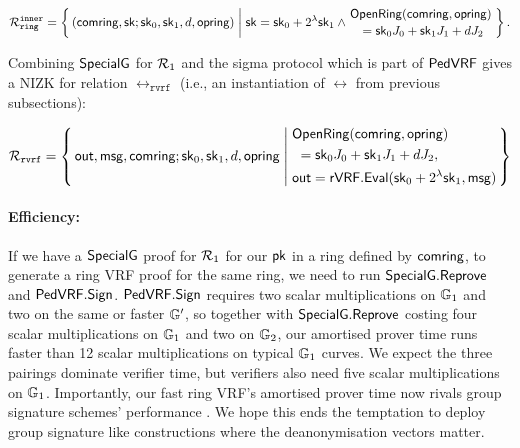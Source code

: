 $$  \Rring^{\inner} = \Setst{ (\comring, \sk ; \sk_0, \sk_1, d, \openring) }{
  \sk = \sk_0+ 2^{\lambda} \sk_1 \wedge
 \genfrac{}{}{0pt}{}{ \eprint{\rVRF.}{}\OpenRing(\comring,\openring) }{ \,\, = \sk_0 \genJ_0 + \sk_1 \genJ_1 + d \genJ_2 }
} \mathperiod $$

Combining ${\mathsf{SpecialG}}$ for $\mathcal{R}_1$ and the sigma protocol which is part of ${\mathsf{PedVRF}}$ gives a 
NIZK for relation $\rel_{\mathtt{rvrf}}$ (i.e., an instantiation of $\rel$ from previous subsections):

$$ \rel_{\mathtt{rvrf}} = \Setst{ \Out, \msg, \comring ; \sk_0,\sk_1, d, \openring }{
    \eprint{
        \eprint{\rVRF.}{}\OpenRing(\comring,\openring)    \textrm{ and }
        \,\, = \sk_0 \genJ_0 + \sk_1 \genJ_1 + d \genJ_2, \quad
        \Out = \rVRF.\Eval(\sk_0+ 2^{\lambda} \sk_1,\msg)
    }{
        \begin{aligned}
        & \eprint{\rVRF.}{}\OpenRing(\comring,\openring) \\
        & \,\, = \sk_0 \genJ_0 + \sk_1 \genJ_1 + d \genJ_2,\\
        & \Out = \rVRF.\Eval(\sk_0+ 2^{\lambda} \sk_1,\msg)
        \end{aligned}
    }
} $$


\paragraph{Efficiency:} If we have a ${\mathsf{SpecialG}}$ proof for $\mathcal{R}_1$ for our $\mathsf{pk}$ in a ring defined by $\mathsf{comring}$, 
to generate a ring VRF proof for the same ring, we need to run ${\mathsf{SpecialG}}.{\mathsf{Reprove}}$ and ${\mathsf{PedVRF}}.{\mathsf{Sign}}$. ${\mathsf{PedVRF}}.{\mathsf{Sign}}$ 
requires two scalar multiplications on ${\mathbb{G}}_1$
and two on the same or faster ${\mathbb{G}}'$,
so together with ${\mathsf{SpecialG}}.{\mathsf{Reprove}}$ costing four scalar multiplications
on ${\mathbb{G}}_1$ and two on ${\mathbb{G}}_2$, our amortised prover time
runs faster than 12 scalar multiplications on typical ${\mathbb{G}}_1$ curves. 
We expect the three pairings dominate verifier time, but
verifiers also need five scalar multiplications on ${\mathbb{G}}_1$.
Importantly, our fast ring VRF's amortised prover time now rivals
group signature schemes' performance \cite{group_sig_survey}.
We hope this ends the temptation to deploy group signature like
 constructions where the deanonymisation vectors matter. 


\begin{comment}
\paragraph{Efficiency:} If we have a $\SpecialG$ proof for $\relinner$ for our $\pk$ in a ring defined by $\comring$, 
to generate a ring VRF proof for the same ring, we need to run $\SpecialG.\Reprove$ and $\NIZK_{\mathcal{R}_{eval}}.\Prove$. $\NIZK_{\mathcal{R}_{eval}}.\Prove$ 
requires two scalar multiplications on $\grE_1$
and two on the same or faster $\grE'$,
so together with $\SpecialG.\Reprove$ costing four scalar multiplications
on $\grE_1$ and two on $\grE_2$, our amortised prover time
runs faster than 12 scalar multiplications on typical $\grE_1$ curves. 
We expect the three pairings dominate verifier time, but
verifiers also need five scalar multiplications on $\grE_1$.
\end{comment}

